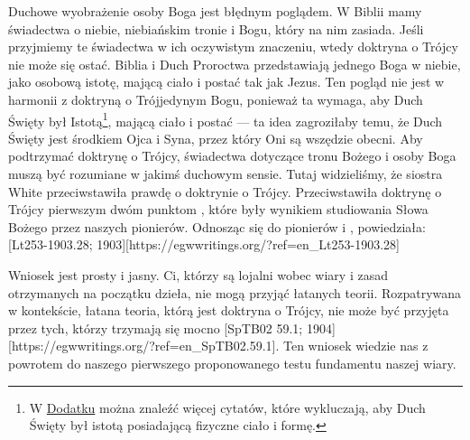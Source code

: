 Duchowe wyobrażenie osoby Boga jest błędnym poglądem. W Biblii mamy świadectwa o niebie, niebiańskim tronie i Bogu, który na nim zasiada. Jeśli przyjmiemy te świadectwa w ich oczywistym znaczeniu, wtedy doktryna o Trójcy nie może się ostać. Biblia i Duch Proroctwa przedstawiają jednego Boga w niebie, jako osobową istotę, mającą ciało i postać tak jak Jezus. Ten pogląd nie jest w harmonii z doktryną o Trójjedynym Bogu, ponieważ ta wymaga, aby Duch Święty był Istotą\footnote{W \hyperref[appendix:unauthenticated-reports]{Dodatku} można znaleźć więcej cytatów, które wykluczają, aby Duch Święty był istotą posiadającą fizyczne ciało i formę.}, mającą ciało i postać — ta idea zagroziłaby temu, że Duch Święty jest środkiem Ojca i Syna, przez który Oni są wszędzie obecni. Aby podtrzymać doktrynę o Trójcy, świadectwa dotyczące tronu Bożego i osoby Boga muszą być rozumiane w jakimś duchowym sensie. Tutaj widzieliśmy, że siostra White przeciwstawiła prawdę o  doktrynie o Trójcy. Przeciwstawiła doktrynę o Trójcy pierwszym dwóm punktom , które były wynikiem studiowania Słowa Bożego przez naszych pionierów. Odnosząc się do pionierów i , powiedziała: [Lt253-1903.28; 1903][https://egwwritings.org/?ref=en\_Lt253-1903.28]

Wniosek jest prosty i jasny. Ci, którzy są lojalni wobec wiary i zasad otrzymanych na początku dzieła, nie mogą przyjąć łatanych teorii. Rozpatrywana w kontekście, łatana teoria, którą jest doktryna o Trójcy, nie może być przyjęta przez tych, którzy trzymają się mocno [SpTB02 59.1; 1904][https://egwwritings.org/?ref=en\_SpTB02.59.1]. Ten wniosek wiedzie nas z powrotem do naszego pierwszego proponowanego testu fundamentu naszej wiary.


